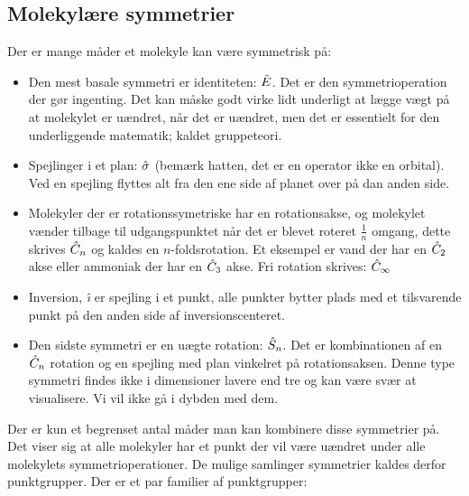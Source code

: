 \documentclass[../../Atom-ogMolekylefysik.tex]{subfiles}
\begin{document}
\subsection{Molekylære symmetrier}
Der er mange måder et molekyle kan være symmetrisk på:
\begin{itemize}
    \item Den mest basale symmetri er identiteten: $\hat E$. Det er den symmetrioperation der gør ingenting. Det kan måske godt virke lidt underligt at lægge vægt på at molekylet er uændret, når det er uændret, men det er essentielt for den underliggende matematik; kaldet gruppeteori.
    \item Spejlinger i et plan: $\hat \sigma$ (bemærk hatten, det er en operator ikke en orbital). Ved en spejling flyttes alt fra den ene side af planet over på dan anden side. 
    \item Molekyler der er rotationssymetriske har en rotationsakse, og molekylet vænder tilbage til udgangspunktet når det er blevet roteret $\frac{1}{n}$ omgang, dette skrives $\hat C_n$ og kaldes en $n$-foldsrotation. Et eksempel er vand der har en $\hat C_2$ akse eller ammoniak der har en $\hat C_3$ akse. Fri rotation skrives: $\hat C_\infty$
    \item Inversion, \textit{\^\i} er spejling i et punkt, alle punkter bytter plads med et tilsvarende punkt på den anden side af inversionscenteret. 
    \item Den sidste symmetri er en uægte rotation: $\hat S_n$. Det er kombinationen af en $\hat C_n$ rotation og en spejling med plan vinkelret på rotationsaksen. Denne type symmetri findes ikke i dimensioner lavere end tre og kan være svær at visualisere. Vi vil ikke gå i dybden med dem.
\end{itemize}
Der er kun et begrenset antal måder man kan kombinere disse symmetrier på. Det viser sig at alle molekyler har et punkt der vil være uændret under alle molekylets symmetrioperationer. De mulige samlinger symmetrier kaldes derfor punktgrupper. Der er et par familier af punktgrupper:
\end{document}
